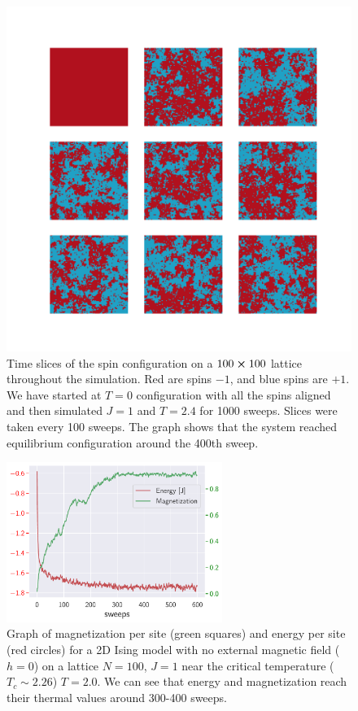 \begin{figure}[H]
	\centering
	\includegraphics[width=13cm]{figures/introduction/configurations.pdf}
	\caption{Time slices of the spin configuration on a $100 \cross 100$ lattice throughout the simulation. Red are spins $-1$, and blue spins are $+1$. We have started at $T=0$ configuration with all the spins aligned and then simulated $J=1$ and $T=2.4$ for 1000 sweeps. Slices were taken every 100 sweeps. The graph shows that the system reached equilibrium configuration around the 400th sweep.}
	\label{gr:configurations}
\end{figure}
\begin{figure}[H]
	\centering
	\includegraphics[width=7cm]{figures/introduction/thermalization.pdf}
	\caption{Graph of magnetization per site (green squares) and energy per site (red circles) for a 2D Ising model with no external magnetic field ($h=0$) on a lattice $N=100$, $J=1$ near the critical temperature ($T_c \sim 2.26$)  $T=2.0$. We can see that energy and magnetization reach their thermal values around 300-400 sweeps.}
	\label{gr:themalization}
\end{figure}
